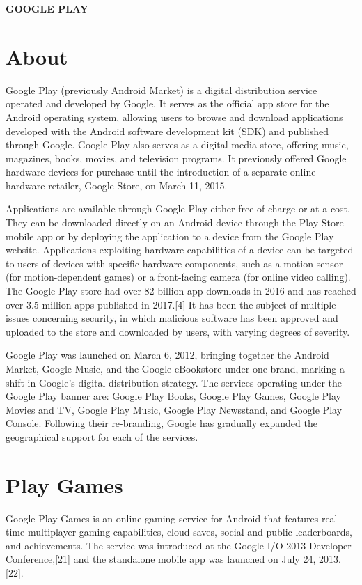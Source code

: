 \documentclass{article}                    %
\begin{document}
 
\textbf{{ GOOGLE PLAY} }  
\section{ About}    
Google Play (previously Android Market) is a digital distribution service operated and developed by Google. It serves as the official app store for the Android operating system, allowing users to browse and download applications developed with the Android software development kit (SDK) and published through Google. Google Play also serves as a digital media store, offering music, magazines, books, movies, and television programs. It previously offered Google hardware devices for purchase until the introduction of a separate online hardware retailer, Google Store, on March 11, 2015.

Applications are available through Google Play either free of charge or at a cost. They can be downloaded directly on an Android device through the Play Store mobile app or by deploying the application to a device from the Google Play website. Applications exploiting hardware capabilities of a device can be targeted to users of devices with specific hardware components, such as a motion sensor (for motion-dependent games) or a front-facing camera (for online video calling). The Google Play store had over 82 billion app downloads in 2016 and has reached over 3.5 million apps published in 2017.[4] It has been the subject of multiple issues concerning security, in which malicious software has been approved and uploaded to the store and downloaded by users, with varying degrees of severity.

Google Play was launched on March 6, 2012, bringing together the Android Market, Google Music, and the Google eBookstore under one brand, marking a shift in Google's digital distribution strategy. The services operating under the Google Play banner are: Google Play Books, Google Play Games, Google Play Movies and TV, Google Play Music, Google Play Newsstand, and Google Play Console. Following their re-branding, Google has gradually expanded the geographical support for each of the services.

\section{ Play Games}    
Google Play Games is an online gaming service for Android that features real-time multiplayer gaming capabilities, cloud saves, social and public leaderboards, and achievements. The service was introduced at the Google I/O 2013 Developer Conference,[21] and the standalone mobile app was launched on July 24, 2013.[22].
\end{document}

